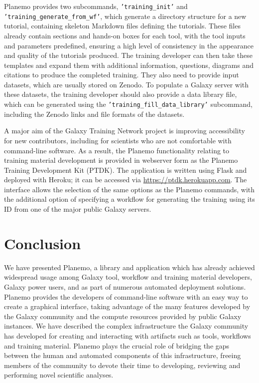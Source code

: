 Planemo provides two subcommands, \texttt{'training\_init'} and
\texttt{'training\_generate\_from\_wf'}, which generate a directory
structure for a new tutorial, containing skeleton Markdown files
defining the tutorials. These files already contain sections and
hands-on boxes for each tool, with the tool inputs and parameters
predefined, ensuring a high level of consistency in the appearance and
quality of the tutorials produced. The training developer can then take
these templates and expand them with additional information, questions,
diagrams and citations to produce the completed training. They also need
to provide input datasets, which are usually stored on Zenodo. To
populate a Galaxy server with these datasets, the training developer
should also provide a data library file, which can be generated using
the \texttt{'training\_fill\_data\_library'} subcommand, including the
Zenodo links and file formats of the datasets.

A major aim of the Galaxy Training Network project is improving
accessibility for new contributors, including for scientists who are not
comfortable with command-line software. As a result, the Planemo
functionality relating to training material development is provided in
webserver form as the Planemo Training Development Kit (PTDK). The
application is written using Flask and deployed with Heroku; it can be
accessed via
\protect\hypertarget{ext-link-14}{\url{https://ptdk.herokuapp.com}}. The
interface allows the selection of the same options as the Planemo
commands, with the additional option of specifying a workflow for
generating the training using its ID from one of the major public Galaxy
servers.

\section*{Conclusion}

We have presented Planemo, a library and application which has already
achieved widespread usage among Galaxy tool, workflow and training
material developers, Galaxy power users, and as part of numerous
automated deployment solutions. Planemo provides the developers of
command-line software with an easy way to create a graphical interface,
taking advantage of the many features developed by the Galaxy community
and the compute resources provided by public Galaxy instances. We have
described the complex infrastructure the Galaxy community has developed
for creating and interacting with artifacts such as tools, workflows and
training material. Planemo plays the crucial role of bridging the gaps
between the human and automated components of this infrastructure,
freeing members of the community to devote their time to developing,
reviewing and performing novel scientific analyses.

